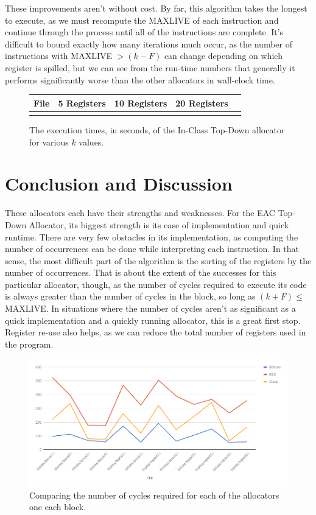 \documentclass[answers]{exam}
\begin{document}
		These improvements aren't without cost. By far, this algorithm takes the longest to execute, as we must recompute the MAXLIVE of each instruction and continue through the process until all of the instructions are complete. It's difficult to bound exactly how many iterations much occur, as the number of instructions with MAXLIVE $> (k - F)$ can change depending on which register is spilled, but we can see from the run-time numbers that generally it performs significantly worse than the other allocators in wall-clock time.
		
		\begin{figure}[H]
			\centering
			\begin{tabular}{c|c|c|c|c}%
				 \bfseries File & \bfseries 5 Registers & \bfseries 10 Registers & \bfseries 20 Registers
				\csvreader[head to column names]{t_times.csv}{}%
				{\\\hline \file & \fiveregs & \tenregs & \twentyregs}
			\end{tabular}
			\caption{The execution times, in seconds, of the In-Class Top-Down allocator for various $k$ values.}
		\end{figure}
		
\section{Conclusion and Discussion}
	These allocators each have their strengths and weaknesses. For the EAC Top-Down Allocator, its biggest strength is its ease of implementation and quick runtime. There are very few obstacles in its implementation, as computing the number of occurrences can be done while interpreting each instruction. In that sense, the most difficult part of the algorithm is the sorting of the registers by the number of occurrences. That is about the extent of the successes for this particular allocator, though, as the number of cycles required to execute its code is always greater than the number of cycles in the block, so long as $(k+F) \leq $ MAXLIVE. In situations where the number of cycles aren't as significant as a quick implementation and a quickly running allocator, this is a great first stop. Register re-use also helps, as we can reduce the total number of registers used in the program.
	
	\begin{figure}[H]
			\centering
			\includegraphics[scale=0.5]{all_cycles.png}
			\caption{Comparing the number of cycles required for each of the allocators one each block.}
		\end{figure}
	
\end{document}
